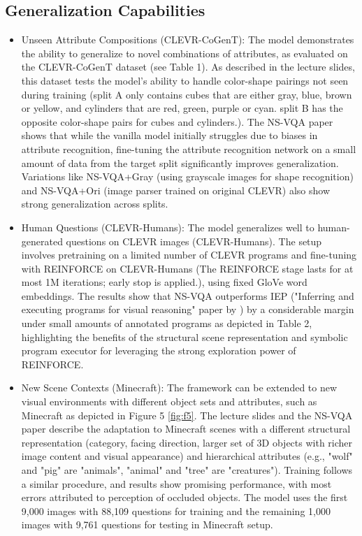 \documentclass[10pt, oneside]{article}
\begin{document}
\subsection{Generalization Capabilities}
\begin{itemize}
    \item Unseen Attribute Compositions (CLEVR-CoGenT): The model demonstrates the ability to generalize to novel combinations of attributes, as evaluated on the CLEVR-CoGenT dataset (see Table 1). As described in the lecture slides, this dataset tests the model's ability to handle color-shape pairings not seen during training (split A only contains cubes that are either gray, blue, brown or yellow, and cylinders that are red, green, purple or cyan. split B has the opposite color-shape pairs for cubes and cylinders.). The NS-VQA paper \cite{Yi2018} shows that while the vanilla model initially struggles due to biases in attribute recognition, fine-tuning the attribute recognition network on a small amount of data from the target split significantly improves generalization. Variations like NS-VQA+Gray (using grayscale images for shape recognition) and NS-VQA+Ori (image parser trained on original CLEVR) also show strong generalization across splits.
    \item Human Questions (CLEVR-Humans): The model generalizes well to human-generated questions on CLEVR images (CLEVR-Humans). The setup involves pretraining on a limited number of CLEVR programs and fine-tuning with REINFORCE on CLEVR-Humans (The REINFORCE stage lasts for at most 1M iterations; early stop is applied.), using fixed GloVe word embeddings. The results show that NS-VQA outperforms IEP ("Inferring and executing programs for visual reasoning" paper by \citet{Johnson2017b}) by a considerable margin under small amounts of annotated programs as depicted in Table 2, highlighting the benefits of the structural scene representation and symbolic program executor for leveraging the strong exploration power of REINFORCE.
    \item New Scene Contexts (Minecraft): The framework can be extended to new visual environments with different object sets and attributes, such as Minecraft as depicted in Figure 5 \ref{fig:f5}. The lecture slides and the NS-VQA paper \cite{Yi2018} describe the adaptation to Minecraft scenes with a different structural representation (category, facing direction, larger set of 3D objects with richer image content and visual appearance) and hierarchical attributes (e.g., "wolf" and "pig" are "animals", "animal" and "tree" are "creatures"). Training follows a similar procedure, and results show promising performance, with most errors attributed to perception of occluded objects.
    The model uses the first 9,000 images with 88,109 questions for training and the remaining 1,000 images with 9,761 questions for testing in Minecraft setup.
    
\end{itemize}
\end{document}
